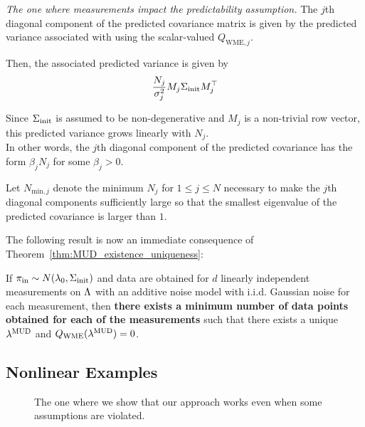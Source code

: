 \begin{frame}[t]{\it The one where measurements impact the predictability assumption.}
\centering
The $j$th diagonal component of the predicted covariance matrix is given by the predicted variance associated with using the scalar-valued $Q_{\text{WME},j}$.

Then, the associated predicted variance is given by
\begin{equation}
	\frac{N_j}{\sigma_j^2} M_j\Sigma_\text{init} M_j^\top
\end{equation}

Since $\Sigma_\text{init}$ is assumed to be non-degenerative and $M_j$ is a non-trivial row vector, this predicted variance grows linearly with $N_j$.\\
\vskip 12pt
In other words, the $j$th diagonal component of the predicted covariance has the form $\beta_j N_j$ for some $\beta_j>0$.
\end{frame}


\begin{frame}[t]
\centering
Let $N_{\text{min},j}$ denote the minimum $N_j$ for $1\leq j\leq N$ necessary to make the $j$th diagonal components sufficiently large so that the smallest eigenvalue of the predicted covariance is larger than $1$.

\vskip 12pt
The following result is now an immediate consequence of Theorem~\ref{thm:MUD_existence_uniqueness}:\\

\begin{corollary}\label{cor:MUD_wme}
If $\operatorname*{\pi_{in}} \sim N(\lambda_0,\Sigma_\text{init})$ and data are obtained for $d$ linearly independent measurements on ${\Lambda}$ with an additive noise model with i.i.d. Gaussian noise for each measurement, then {\bf there exists a minimum number of data points obtained for each of the measurements} such that there exists a unique $\lambda^{\text{MUD}}$ and $Q_\text{WME}(\lambda^{\text{MUD}}) = 0$.
\end{corollary}


\end{frame}

\subsection{Nonlinear Examples}

\begin{frame}[t]
\centering
\begin{figure}
\centering

The one where we show that our approach works even when some assumptions are violated.

\end{figure}

\end{frame}

